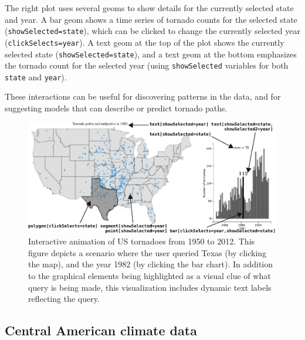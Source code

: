 \documentclass[12pt,]{article}
\theoremstyle{definition}
\theoremstyle{definition}
\theoremstyle{definition}
\theoremstyle{remark}
\begin{document}
The right plot uses several geoms to show details for the currently
selected state and year. A bar geom shows a time series of tornado
counts for the selected state (\texttt{showSelected=state}), which can
be clicked to change the currently selected year
(\texttt{clickSelects=year}). A text geom at the top of the plot shows
the currently selected state (\texttt{showSelected=state}), and a text
geom at the bottom emphasizes the tornado count for the selected year
(using \texttt{showSelected} variables for both \texttt{state} and
\texttt{year}).

These interactions can be useful for discovering patterns in the data,
and for suggesting models that can describe or predict tornado paths.

\begin{figure}
\centering
\includegraphics{images/figure-tornado}
\caption{\label{fig:tornado}Interactive animation of US tornadoes from 1950
to 2012. This figure depicts a scenario where the user queried Texas (by
clicking the map), and the year 1982 (by clicking the bar chart). In
addition to the graphical elements being highlighted as a visual clue of
what query is being made, this visualization includes dynamic text
labels reflecting the query.}
\end{figure}

\hypertarget{central-american-climate-data}{%
\subsection{Central American climate
data}\label{central-american-climate-data}}
\end{document}
